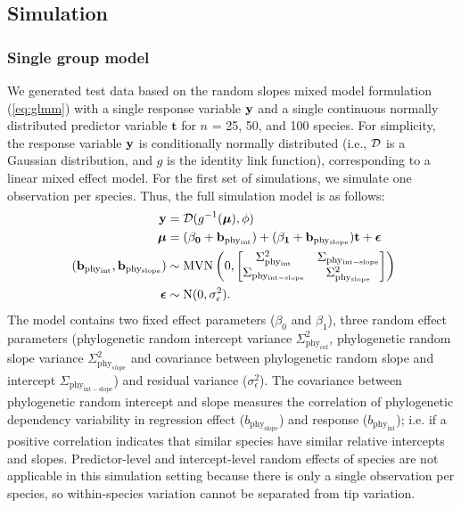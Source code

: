 \documentclass[12pt]{article}
\begin{document}
\subsection*{Simulation}
\subsubsection*{Single group model}

We generated test data based on the random slopes mixed model formulation (\ref{eq:glmm}) with a single response variable ${\mathbf y}$ and a single continuous normally distributed predictor variable $\bm{t}$ for $n$ = 25, 50, and 100 species.
For simplicity, the response variable ${\mathbf y}$ is conditionally normally distributed (i.e., $\cal{D}$ is a Gaussian distribution, and $g$ is the identity link function), corresponding to a linear mixed effect model. 
For the first set of simulations, we simulate one observation per species.
Thus, the full simulation model is as follows:
\begin{equation}
\begin{aligned}
{\mathbf y} & = {\cal D}(g^{-1}({\boldsymbol \mu}), \phi) \\
{\boldsymbol \mu} & = (\bf{\beta_0 + b_{\mathrm{phy_{int}}}}) + (\bf{\beta_1 + b_{\mathrm{phy_{slope}}}}) \bm{t} + {\boldsymbol \epsilon} \\\
(\bf{b_{\mathrm{phy_{int}}}, b_{\mathrm{phy_{slope}}}}) & \sim \textrm{MVN} \left( 0, \begin{bmatrix}
\Sigma^2_{\mathrm{phy_{int}}} & \Sigma_{\mathrm{phy_{int-slope}}} \\ 
\Sigma_{\mathrm{phy_{int-slope}}} & \Sigma^2_{\mathrm{phy_{slope}}}
\end{bmatrix} 
\right) \\ 
{\boldsymbol \epsilon} & \sim \textrm{N} ( 0 , \sigma_{\epsilon}^2) .
\label{eq:single_glmm}
\end{aligned}
\end{equation}
The model contains two fixed effect parameters ($\beta_0$ and $\beta_1$), three random effect parameters (phylogenetic random intercept variance $\Sigma^2_{\mathrm{phy}_{int}}$, phylogenetic random slope variance $\Sigma^2_{\mathrm{phy}_{slope}}$ and covariance between phylogenetic random slope and intercept $\Sigma_{\mathrm{phy_{int-slope}}}$) and residual variance ($\sigma_{\epsilon}^2$).  
The covariance between phylogenetic random intercept and slope measures the correlation of phylogenetic dependency variability in regression effect ($b_{\mathrm{phy_{slope}}}$) and response ($b_{\mathrm{phy_{int}}}$); i.e. if a positive correlation indicates that similar species have similar relative intercepts and slopes.
Predictor-level and intercept-level random effects of species are not applicable in this simulation setting because there is only a single observation per species, so within-species variation cannot be separated from tip variation.
\end{document}
